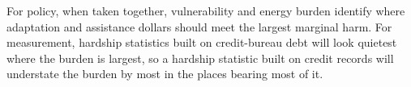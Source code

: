 \documentclass[a4paper,11pt]{article}
\begin{document}
For policy, when taken together, vulnerability and energy burden identify where adaptation and assistance dollars should meet the largest marginal harm. For measurement, hardship statistics built on credit-bureau debt will look quietest where the burden is largest, so a hardship statistic built on credit records will understate the burden by most in the places bearing most of it.

\FloatBarrier
\clearpage


\end{document}
